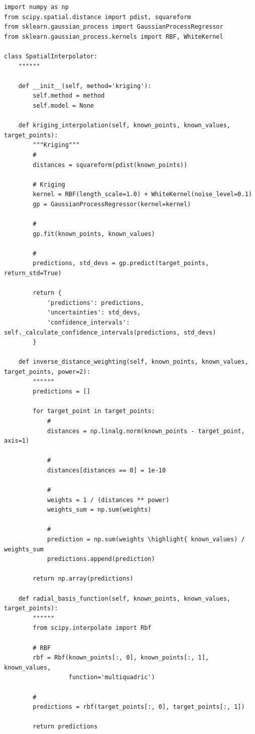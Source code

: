 \begin{lstlisting}[style=python]
import numpy as np
from scipy.spatial.distance import pdist, squareform
from sklearn.gaussian_process import GaussianProcessRegressor
from sklearn.gaussian_process.kernels import RBF, WhiteKernel

class SpatialInterpolator:
    """"""
    
    def __init__(self, method='kriging'):
        self.method = method
        self.model = None
        
    def kriging_interpolation(self, known_points, known_values, target_points):
        """Kriging"""
        # 
        distances = squareform(pdist(known_points))
        
        # Kriging
        kernel = RBF(length_scale=1.0) + WhiteKernel(noise_level=0.1)
        gp = GaussianProcessRegressor(kernel=kernel)
        
        # 
        gp.fit(known_points, known_values)
        
        # 
        predictions, std_devs = gp.predict(target_points, return_std=True)
        
        return {
            'predictions': predictions,
            'uncertainties': std_devs,
            'confidence_intervals': self._calculate_confidence_intervals(predictions, std_devs)
        }
    
    def inverse_distance_weighting(self, known_points, known_values, target_points, power=2):
        """"""
        predictions = []
        
        for target_point in target_points:
            # 
            distances = np.linalg.norm(known_points - target_point, axis=1)
            
            # 
            distances[distances == 0] = 1e-10
            
            # 
            weights = 1 / (distances ** power)
            weights_sum = np.sum(weights)
            
            # 
            prediction = np.sum(weights \highlight{ known_values) / weights_sum
            predictions.append(prediction)
        
        return np.array(predictions)
    
    def radial_basis_function(self, known_points, known_values, target_points):
        """"""
        from scipy.interpolate import Rbf
        
        # RBF
        rbf = Rbf(known_points[:, 0], known_points[:, 1], known_values, 
                  function='multiquadric')
        
        # 
        predictions = rbf(target_points[:, 0], target_points[:, 1])
        
        return predictions
\end{lstlisting}

